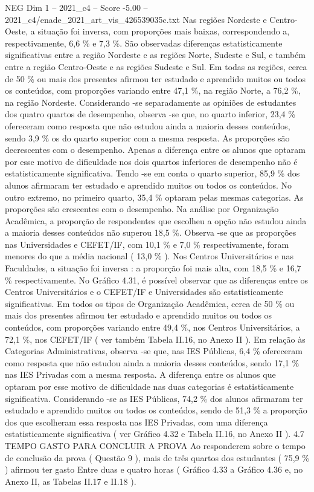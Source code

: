\begin{textsample}{NEG Dim 1 – 2021\_c4 – Score -5.00 – 2021\_c4/enade\_2021\_art\_vis\_426539035c.txt}
Nas regiões Nordeste e Centro-Oeste, a situação foi inversa, com proporções mais baixas, correspondendo a, respectivamente, 6,6 \% e 7,3 \%.
São observadas diferenças estatisticamente significativas entre a região Nordeste e as regiões Norte, Sudeste e Sul, e também entre a região Centro-Oeste e as regiões Sudeste e Sul.
Em todas as regiões, cerca de 50 \% ou mais dos presentes afirmou ter estudado e aprendido muitos ou todos os conteúdos, com proporções variando entre 47,1 \%, na região Norte, a 76,2 \%, na região Nordeste.
Considerando -se separadamente as opiniões de estudantes dos quatro quartos de desempenho, observa -se que, no quarto inferior, 23,4 \% ofereceram como resposta que não estudou ainda a maioria desses conteúdos, sendo 3,9 \% os do quarto superior com a mesma resposta.
As proporções são decrescentes com o desempenho.
Apenas a diferença entre os alunos que optaram por esse motivo de dificuldade nos dois quartos inferiores de desempenho não é estatisticamente significativa.
Tendo -se em conta o quarto superior, 85,9 \% dos alunos afirmaram ter estudado e aprendido muitos ou todos os conteúdos.
No outro extremo, no primeiro quarto, 35,4 \% optaram pelas mesmas categorias.
As proporções são crescentes com o desempenho.
Na análise por Organização Acadêmica, a proporção de respondentes que escolheu a opção não estudou ainda a maioria desses conteúdos não superou 18,5 \%.
Observa -se que as proporções nas Universidades e CEFET/IF, com 10,1 \% e 7,0 \% respectivamente, foram menores do que a média nacional ( 13,0 \% ).
Nos Centros Universitários e nas Faculdades, a situação foi inversa : a proporção foi mais alta, com 18,5 \% e 16,7 \% respectivamente.
No Gráfico 4.31, é possível observar que as diferenças entre os Centros Universitários e o CEFET/IF e Universidades são estatisticamente significativas.
Em todos os tipos de Organização Acadêmica, cerca de 50 \% ou mais dos presentes afirmou ter estudado e aprendido muitos ou todos os conteúdos, com proporções variando entre 49,4 \%, nos Centros Universitários, a 72,1 \%, nos CEFET/IF ( ver também Tabela II.16, no Anexo II ).
Em relação às Categorias Administrativas, observa -se que, nas IES Públicas, 6,4 \% ofereceram como resposta que não estudou ainda a maioria desses conteúdos, sendo 17,1 \% nas IES Privadas com a mesma resposta.
A diferença entre os alunos que optaram por esse motivo de dificuldade nas duas categorias é estatisticamente significativa.
Considerando -se as IES Públicas, 74,2 \% dos alunos afirmaram ter estudado e aprendido muitos ou todos os conteúdos, sendo de 51,3 \% a proporção dos que escolheram essa resposta nas IES Privadas, com uma diferença estatisticamente significativa ( ver Gráfico 4.32 e Tabela II.16, no Anexo II ). 4.7 TEMPO GASTO PARA CONCLUIR A PROVA Ao responderem sobre o tempo de conclusão da prova ( Questão 9 ), mais de três quartos dos estudantes ( 75,9 \% ) afirmou ter gasto Entre duas e quatro horas ( Gráfico 4.33 a Gráfico 4.36 e, no Anexo II, as Tabelas II.17 e II.18 ).

\end{textsample}
